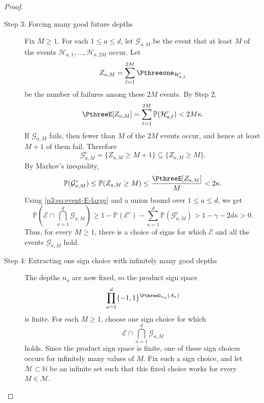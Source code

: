 \documentclass[11pt,reqno]{amsart}
\makeatletter
\theoremstyle{plain}
\theoremstyle{definition}
\newcommand{\N}{\mathbb N}
\newcounter{problempaper}
\newenvironment{problempaperbody}{%
  \setcounter{subsection}{0}%
  \setcounter{subsubsection}{0}%
  \setcounter{paragraph}{0}%
  \renewcommand{\thesubsection}{\arabic{subsection}}%
  \renewcommand{\thesubsubsection}{\thesubsection.\arabic{subsubsection}}%
  \renewcommand{\theparagraph}{\thesubsubsection.\arabic{paragraph}}%
  \let\problem@outersection\section
  \let\problem@outersubsection\subsection
  \let\problem@outersubsubsection\subsubsection
  \let\problem@outerparagraph\paragraph
  \let\section\problem@papersection
  \let\subsection\problem@papersubsection
  \let\subsubsection\problem@papersubsubsection
}{%
  \let\section\problem@outersection
  \let\subsection\problem@outersubsection
  \let\subsubsection\problem@outersubsubsection
  \let\paragraph\problem@outerparagraph
}
\newcommand{\problem@target}[2]{%
  \hypertarget{problem-\theproblempaper-#1-#2}{}%
}
\newcommand{\problem@paperheading}[3]{%
  \par\bigskip
  \problem@target{#1}{#2}%
  \noindent{\large\bfseries #2.\quad #3\par}%
  \nobreak\smallskip
}
\newcommand{\problem@papersubheading}[3]{%
  \par\medskip
  \problem@target{#1}{#2}%
  \noindent{\normalsize\bfseries #2.\quad #3\par}%
  \nobreak\smallskip
}
\newcommand{\problem@papersubsubheading}[3]{%
  \par\smallskip
  \problem@target{#1}{#2}%
  \noindent{\normalsize\itshape #2.\quad #3.\ }%
}
\def\problem@papersection{%
  \@ifstar{\problem@papersectionstar}{\problem@papersectionnostar}%
}
\def\problem@papersectionstar#1{%
  \par\bigskip\noindent{\large\bfseries #1\par}\nobreak\smallskip
}
\def\problem@papersectionnostar#1{%
  \refstepcounter{subsection}%
  \setcounter{subsubsection}{0}%
  \setcounter{paragraph}{0}%
  \problem@paperheading{section}{\thesubsection}{#1}%
  \problem@writecontentsline{section}{\thesubsection}{#1}%
}
\def\problem@papersubsection{%
  \@ifstar{\problem@papersubsectionstar}{\problem@papersubsectionnostar}%
}
\def\problem@papersubsectionstar#1{%
  \par\medskip\noindent{\normalsize\bfseries #1\par}\nobreak\smallskip
}
\def\problem@papersubsectionnostar#1{%
  \refstepcounter{subsubsection}%
  \setcounter{paragraph}{0}%
  \problem@papersubheading{subsection}{\thesubsubsection}{#1}%
  \problem@writecontentsline{subsection}{\thesubsubsection}{#1}%
}
\def\problem@papersubsubsection{%
  \@ifstar{\problem@papersubsubsectionstar}{\problem@papersubsubsectionnostar}%
}
\def\problem@papersubsubsectionstar#1{%
  \par\smallskip\noindent{\normalsize\itshape #1.\ }%
}
\def\problem@papersubsubsectionnostar#1{%
  \refstepcounter{paragraph}%
  \problem@papersubsubheading{subsubsection}{\theparagraph}{#1}%
  \problem@writecontentsline{subsubsection}{\theparagraph}{#1}%
}
\newcommand{\problem@writecontentsline}[3]{%
  \begingroup
  \protected@write\@auxout{}{%
    \string\problemcontentsentry{\theproblempaper}{#1}{#2}{#3}{\thepage}%
  }%
  \endgroup
}
\newcommand{\problemcontentsentry}[5]{%
  \@ifundefined{problemcontents@#1}{%
    \expandafter\gdef\csname problemcontents@#1\endcsname{}%
  }{}%
  \expandafter\g@addto@macro\csname problemcontents@#1\endcsname{%
    \problemcontentsline{#1}{#2}{#3}{#4}{#5}%
  }%
}
\newcommand{\problemcontentslink}[4]{%
  \hyperlink{problem-#1-#2-#3}{#4}%
}
\newcommand{\problemcontentsline}[5]{%
  \ifstrequal{#2}{section}{%
    \par\noindent
    \problemcontentslink{#1}{#2}{#3}{\makebox[2.5em][l]{#3}#4}%
    \nobreak\dotfill
    \problemcontentslink{#1}{#2}{#3}{#5}\par
  }{%
    \ifstrequal{#2}{subsection}{%
      \par\noindent\hspace*{1.5em}%
      \problemcontentslink{#1}{#2}{#3}{\makebox[3.5em][l]{#3}#4}%
      \nobreak\dotfill
      \problemcontentslink{#1}{#2}{#3}{#5}\par
    }{%
      \par\noindent\hspace*{3em}%
      \problemcontentslink{#1}{#2}{#3}{\makebox[4.5em][l]{#3}#4}%
      \nobreak\dotfill
      \problemcontentslink{#1}{#2}{#3}{#5}\par
    }%
  }%
}
\makeatother
\begin{document}
\begin{problempaperbody}
\begin{proof}
\begin{description}
\item[\textup{Step 3: Forcing many good future depths}]
Fix $M\geq1$. For each $1\leq a\leq d$, let $\mathcal G_{a,M}$ be the event that at least $M$ of the events $\mathcal H_{a,1},\ldots,\mathcal H_{a,2M}$ occur. Let
\begin{equation*}
        Z_{a,M}=\sum_{\ell=1}^{2M}\Pthreeone_{\mathcal H_{a,\ell}^c}
\end{equation*}
be the number of failures among these $2M$ events. By Step 2,
\begin{equation*}
        \PthreeE[Z_{a,M}]=\sum_{\ell=1}^{2M}\mathbb P(\mathcal H_{a,\ell}^c)<2M\kappa.
\end{equation*}
If $\mathcal G_{a,M}$ fails, then fewer than $M$ of the $2M$ events occur, and hence at least $M+1$ of them fail. Therefore
\begin{equation*}
        \mathcal G_{a,M}^c=\{Z_{a,M}\geq M+1\}\subseteq\{Z_{a,M}\geq M\}.
\end{equation*}
By Markov's inequality,
\begin{equation*}
        \mathbb P(\mathcal G_{a,M}^c)\leq \mathbb P(Z_{a,M}\geq M)\leq \frac{\PthreeE[Z_{a,M}]}{M}<2\kappa.
\end{equation*}
Using \eqref{p3:eq:event-E-large} and a union bound over $1\leq a\leq d$, we get
\begin{equation*}
        \mathbb P\left(\mathcal E\cap\bigcap_{a=1}^d\mathcal G_{a,M}\right)\geq 1-\mathbb P(\mathcal E^c)-\sum_{a=1}^d\mathbb P(\mathcal G_{a,M}^c)>1-\gamma-2d\kappa>0.
\end{equation*}
Thus, for every $M\geq1$, there is a choice of signs for which $\mathcal E$ and all the events $\mathcal G_{a,M}$ hold.

\item[\textup{Step 4: Extracting one sign choice with infinitely many good depths}]
The depths $n_a$ are now fixed, so the product sign space
\begin{equation*}
        \prod_{a=1}^d\{-1,1\}^{\PthreeD_{n_a}(A_a)}
\end{equation*}
is finite. For each $M\geq1$, choose one sign choice for which
\begin{equation*}
        \mathcal E\cap\bigcap_{a=1}^d\mathcal G_{a,M}
\end{equation*}
holds. Since the product sign space is finite, one of these sign choices occurs for infinitely many values of $M$. Fix such a sign choice, and let $\mathcal M\subset\N$ be an infinite set such that this fixed choice works for every $M\in\mathcal M$.


\end{description}
\end{proof}
\end{problempaperbody}
\end{document}
